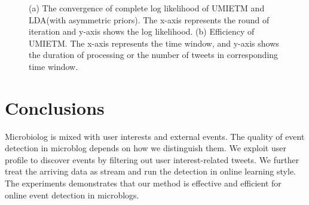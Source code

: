 \documentclass{llncs}
\begin{document}
\begin{figure}
        \centering
        \caption{(a) The convergence of complete log likelihood of UMIETM and LDA(with asymmetric priors). The x-axis represents the round of iteration and y-axis shows the log likelihood. (b) Efficiency of UMIETM. The x-axis represents the time window, and y-axis shows the duration of processing or the number of tweets in corresponding time window.}
\end{figure}


\section{Conclusions}
Microbiolog is mixed with user interests and external events.
The quality of event detection in microblog depends on how we distinguish them.
We exploit user profile to discover events by filtering out user interest-related tweets.
We further treat the arriving data as stream and run the detection in online learning style.
The experiments demonstrates that our method is effective and efficient for online event detection in microblogs.






\end{document}
